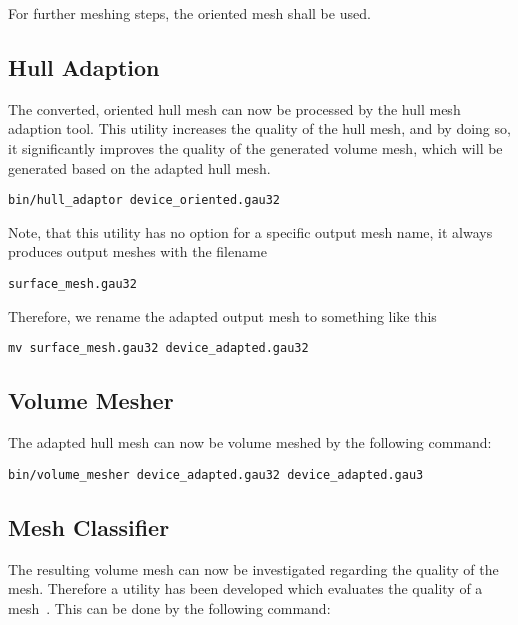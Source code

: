 For further meshing steps, the oriented mesh shall be used.

\newpage

\subsection{Hull Adaption}
The converted, oriented hull mesh can now be processed by the hull mesh adaption 
tool. This utility increases the quality of the hull mesh, and by doing so, 
it significantly improves the quality of the generated volume mesh, which will 
be generated based on the adapted hull mesh.

\begin{exaipd}
\begin{Verbatim}
bin/hull_adaptor device_oriented.gau32
\end{Verbatim}
\end{exaipd}

Note, that this utility has no option for a specific output mesh name, it 
always produces output meshes with the filename

\begin{exaipd}
\begin{Verbatim}
surface_mesh.gau32
\end{Verbatim}
\end{exaipd}

Therefore, we rename the adapted output mesh to something like this

\begin{exaipd}
\begin{Verbatim}
mv surface_mesh.gau32 device_adapted.gau32
\end{Verbatim}
\end{exaipd}

\subsection{Volume Mesher}
The adapted hull mesh can now be volume meshed by the following command:

\begin{exaipd}
\begin{Verbatim}
bin/volume_mesher device_adapted.gau32 device_adapted.gau3
\end{Verbatim}
\end{exaipd}

\subsection{Mesh Classifier}
The resulting volume mesh can now be investigated regarding the quality 
of the mesh. Therefore a utility has been developed which evaluates 
the quality of a mesh~\cite{heinzlgen, stimpflmulti}. 
This can be done by the following command:

